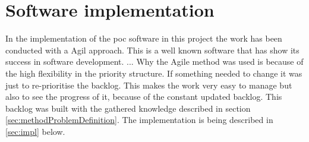 \section{Software implementation}\label{sec:methodSoftwareImplementation}
In the implementation of the \acrshort{poc} software in this project the work has been conducted with a Agil approach. 
This is a well known software that has show its success in software development. ...
Why the Agile method was used is because of the high flexibility in the priority structure.
If something needed to change it was just to re-prioritise the backlog.
This makes the work very easy to manage but also to see the progress of it, because of the constant updated backlog.
This backlog was built with the gathered knowledge described in section \cref{sec:methodProblemDefinition}.
The implementation is being described in \cref{sec:impl} below.

\bigskip

